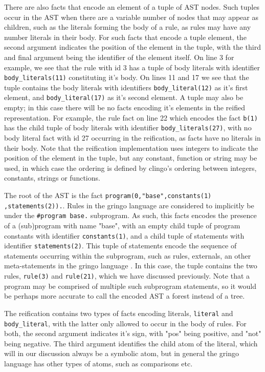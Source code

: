 There are also facts that encode an element of a tuple of AST
nodes. Such tuples occur in the AST when there are a variable number
of nodes that may appear as children, such as the literals forming the
body of a rule, as rules may have any number literals in their
body. For such facts that encode a tuple element, the second argument
indicates the position of the element in the tuple, with the third and
final argument being the identifier of the element itself. On line 3
for example, we see that the rule with id 3 has a tuple of body
literals with identifier \texttt{body\_literals(11)} constituting it's
body. On lines 11 and 17 we see that the tuple contains the body
literals with identifiers \texttt{body\_literal(12)} as it's first
element, and \texttt{body\_literal(17)} as it's second element.  A
tuple may also be empty; in this case there will be no facts encoding
it's elements in the reified representation. For example, the rule
fact on line 22 which encodes the fact \texttt{b(1)} has the child
tuple of body literals with identifier \texttt{body\_literals(27)},
with no body literal fact with id 27 occurring in the reification, as
facts have no literals in their body. Note that the reification
implementation uses integers to indicate the position of the element
in the tuple, but any constant, function or string may be used, in
which case the ordering is defined by clingo's ordering between
integers, constants, strings or functions.

The root of the AST is the fact
\texttt{program(0,"base",constants(1)} \texttt{,statements(2)).}. Rules in the
gringo language are considered to implicitly be under the
\texttt{\#program base.} subprogram\cite{karoscwa21a}. As such, this
facts encodes the presence of a (sub)program with name "base", with an
empty child tuple of program constants with identifier
\texttt{constants(1)}, and a child tuple of statements with identifier
\texttt{statements(2)}. This tuple of statements encode the sequence
of statements occurring within the subprogram, such as rules,
externals, an other meta-statements in the gringo language
\cite{PotasscoUserGuide19}. In this case, the tuple contains the two
rules, \texttt{rule(3)} and \texttt{rule(21)}, which we have discussed
previously. Note that a program may be comprised of multiple such
subprogram statements, so it would be perhaps more accurate to call
the encoded AST a forest instead of a tree.

The reification contains two types of facts encoding literals,
\texttt{literal} and \texttt{body\_literal}, with the latter only
allowed to occur in the body of rules. For both, the second argument
indicates it's sign, with "pos" being positive, and "not" being
negative. The third argument identifies the child atom of the literal,
which will in our discussion always be a symbolic atom, but in general
the gringo language has other types of atoms, such as comparisons etc.

